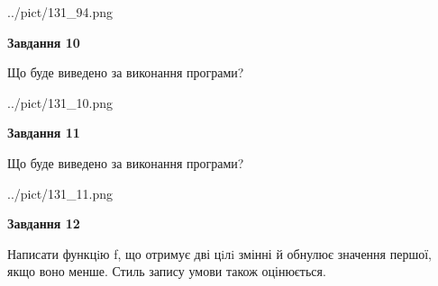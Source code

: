\documentclass[12pt, ukrainian]{article}
\begin{document}
{\begin {large}
\begin{center}
	{../pict/131_94.png}
\end{center}
\newpage

{\begin {center}\textbf{Завдання 10}\end {center}}

Що буде виведено за виконання програми?\par
\begin{center}
	{../pict/131_10.png}
\end{center}
\newpage

{\begin {center}\textbf{Завдання 11}\end {center}}

Що буде виведено за виконання програми?\par
\begin{center}
	{../pict/131_11.png}
\end{center}
\newpage

{\begin {center}\textbf{Завдання 12}\end {center}}


Написати функцiю f, що отримує дві цiлi змінні й обнулює значення першої, якщо воно менше. Стиль запису умови також оцінюється.\par
\newpage

\end {large}}
\end{document}
